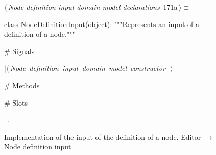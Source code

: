 \documentclass[%
    a4paper,    %
    justified,  %
    nobib,      %
    openany     %
]{tufte-book}
\makeatletter
\renewcommand{\label}[1]{\@tufte@label{##1}}%
\makeatother
\begin{document}
\begin{figure}[!htbp]
\begin{flushleft} \small
\begin{minipage}{\linewidth}\label{scrap140}\raggedright\small
{} $\langle\,${\itshape Node definition input domain model declarations}\nobreak\ {\footnotesize {171a}}$\,\rangle\equiv$
\vspace{-1ex}
\begin{pythoncode}
class NodeDefinitionInput(object):
    """Represents an input of a definition of a node."""

    # Signals

    |\hbox{$\langle\,${\itshape Node definition input domain model constructor}\nobreak\ {\footnotesize {}}$\,\rangle$}|

    # Methods

    # Slots
|\NWsep|
\end{pythoncode}
\vspace{1.5ex}
\footnotesize
\begin{list}{}{\setlength{\itemsep}{-\parsep}\setlength{\itemindent}{-\leftmargin}}
\item \NWtxtMacroRefIn\ .

\item{}
\end{list}
\end{minipage}\vspace{4ex}
\end{flushleft}
\caption{Implementation of the input of the definition of a node.
  \newline{}\newline{}Editor $\rightarrow$ Node definition input}
\end{figure}
\end{document}
